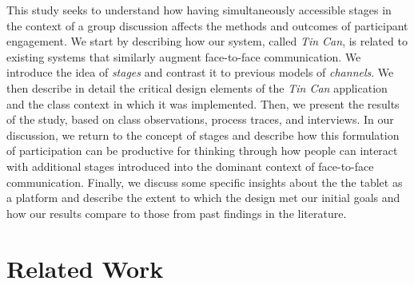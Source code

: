 This study seeks to understand how having simultaneously accessible stages in the context of a group discussion affects the methods and outcomes of participant engagement. We start by describing how our system, called \emph{Tin Can}, is related to existing systems that similarly augment face-to-face communication. We introduce the idea of \emph{stages} and contrast it to previous models of \emph{channels}. We then describe in detail the critical design elements of the \emph{Tin Can} application and the class context in which it was implemented. Then, we present the results of the study, based on class observations, process traces, and interviews.  In our discussion, we return to the concept of stages and describe how this formulation of participation can be productive for thinking through how people can interact with additional stages introduced into the dominant context of face-to-face communication. Finally, we discuss some specific insights about the the tablet as a platform and describe the extent to which the design met our initial goals and how our results compare to those from past findings in the literature.


\section{Related Work}




